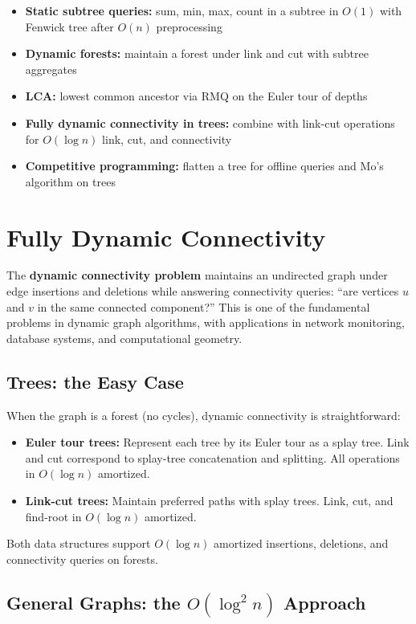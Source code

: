 \begin{itemize}
\item \textbf{Static subtree queries:} sum, min, max, count in a subtree in $O(1)$ with Fenwick tree after $O(n)$ preprocessing
\item \textbf{Dynamic forests:} maintain a forest under link and cut with subtree aggregates
\item \textbf{LCA:} lowest common ancestor via RMQ on the Euler tour of depths
\item \textbf{Fully dynamic connectivity in trees:} combine with link-cut operations for $O(\log n)$ link, cut, and connectivity
\item \textbf{Competitive programming:} flatten a tree for offline queries and Mo's algorithm on trees
\end{itemize}

\section{Fully Dynamic Connectivity}

The \textbf{dynamic connectivity problem} maintains an undirected graph under edge insertions and deletions while answering connectivity queries: ``are vertices $u$ and $v$ in the same connected component?'' This is one of the fundamental problems in dynamic graph algorithms, with applications in network monitoring, database systems, and computational geometry.

\subsection{Trees: the Easy Case}

When the graph is a forest (no cycles), dynamic connectivity is straightforward:

\begin{itemize}
\item \textbf{Euler tour trees:} Represent each tree by its Euler tour as a splay tree. Link and cut correspond to splay-tree concatenation and splitting. All operations in $O(\log n)$ amortized.
\item \textbf{Link-cut trees:} Maintain preferred paths with splay trees. Link, cut, and find-root in $O(\log n)$ amortized.
\end{itemize}

Both data structures support $O(\log n)$ amortized insertions, deletions, and connectivity queries on forests.

\subsection{General Graphs: the $O(\log^2 n)$ Approach}


